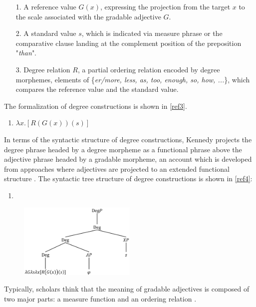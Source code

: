 \documentclass{ctexart}
\let \cite \parencite
\begin{document}
\begin{itemize}
    \item[1.] A reference value $G(x)$, expressing the projection from the target $x$ to the scale associated with the gradable adjective $G$.
    \item[2.] A standard value $s$, which is indicated via measure phrase or the comparative clause landing at the complement position of the preposition "\textit{than}". 
    \item[3.] Degree relation $R$, a partial ordering relation encoded by degree morphemes, elements of \{\textit{er/more, less, as, too, enough, so, how, ...}\}, which compares the reference value and the standard value. 
\end{itemize}

The formalization of degree constructions is shown in \ref{ref3}.

\begin{enumerate}
\item \label{ref3} $\lambda x.[R(G(x))(s)]$
\end{enumerate}

\noindent
In terms of the syntactic structure of degree constructions, Kennedy projects the degree phrase headed by a degree morpheme as a functional phrase above the adjective phrase headed by a gradable morpheme, an account which is developed from approaches where adjectives are projected to an extended functional structure \cite{abney1987,corver1990,corver1997b,grimshaw1991}. The syntactic tree structure of degree constructions is shown in \ref{ref4}:

\begin{enumerate}
\item \label{ref4}
\end{enumerate}

\begin{figure}[h]
\centering
\includegraphics[width=0.5\textwidth]{pic/pic1.png}
\end{figure}

\noindent
Typically, scholars think that the meaning of gradable adjectives is composed of two major parts: a measure function and an ordering relation \cite{carston2013,horn1992}.
\end{document}
